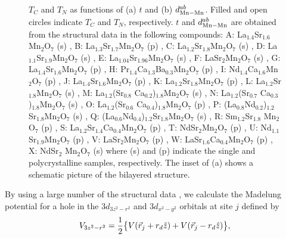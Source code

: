 \begin{figure}
\columnwidth
\centerline{}
\caption{ $T_C$ and $T_N$ as functions of (a) $t$  and (b) $d_{\rm Mn-Mn}^{ab}$.  Filled and open circles indicate $T_C$ and $T_N$, respectively.  $t$ and $d_{\rm Mn-Mn}^{ab}$ are obtained from the structural data in  the following compounds:  A: La$_{1.4}$Sr$_{1.6}$Mn$_2$O$_7$ (s) \protect\cite{kubota},  B: La$_{1.3}$Sr$_{1.7}$Mn$_2$O$_7$ (p) \protect\cite{kubota}, C: La$_{1.2}$Sr$_{1.8}$Mn$_2$O$_7$ (s) \protect\cite{kubota}, D: La$_{1.1}$Sr$_{1.9}$Mn$_2$O$_7$ (s) \protect\cite{kubota}, E: La$_{1.04}$Sr$_{1.96}$Mn$_2$O$_7$ (s) \protect\cite{kubota}, F: LaSr$_2$Mn$_2$O$_7$ (s) \protect\cite{kubota},  G: La$_{1.4}$Sr$_{1.6}$Mn$_2$O$_7$ (p) \protect\cite{argyriou99},  H: Pr$_{1.4}$Ca$_{1.3}$Ba$_{0.3}$Mn$_2$O$_7$ (p) \protect\cite{laffez},  I: Nd$_{1.4}$Ca$_{1.6}$Mn$_2$O$_7$ (p) \protect\cite{laffez},  J: La$_{1.4}$Sr$_{1.6}$Mn$_2$O$_7$ (p) \protect\cite{chi},  K: La$_{1.2}$Sr$_{1.8}$Mn$_2$O$_7$ (p) \protect\cite{argyriou97},  L: La$_{1.2}$Sr$_{1.8}$Mn$_2$O$_7$ (s) \protect\cite{akimoto},  M: La$_{1.2}$(Sr$_{0.8}$ Ca$_{0.2}$)$_{1.8}$Mn$_2$O$_7$ (s) \protect\cite{akimoto},  N: La$_{1.2}$(Sr$_{0.7}$ Ca$_{0.3}$)$_{1.8}$Mn$_2$O$_7$ (s) \protect\cite{akimoto},  O: La$_{1.2}$(Sr$_{0.6}$ Ca$_{0.4}$)$_{1.8}$Mn$_2$O$_7$ (p) \protect\cite{akimoto},  P: (La$_{0.8}$Nd$_{0.2}$)$_{1.2}$Sr$_{1.8}$Mn$_2$O$_7$ (s) \protect\cite{akimoto},  Q: (La$_{0.6}$Nd$_{0.4}$)$_{1.2}$Sr$_{1.8}$Mn$_2$O$_7$ (s) \protect\cite{akimoto},  R: Sm$_{1.2}$Sr$_{1.8}$ Mn$_2$O$_7$ (p) \protect\cite{battle98},  S: La$_{1.2}$Sr$_{1.4}$Ca$_{0.4}$Mn$_2$O$_7$ (p) \protect\cite{shen},  T: NdSr$_2$Mn$_2$O$_7$ (p) \protect\cite{battle96},  U: Nd$_{1.1}$Sr$_{1.9}$Mn$_2$O$_7$ (p) \protect\cite{battle96},  V: LaSr$_2$Mn$_2$O$_7$ (p) \protect\cite{seshadri},  W: LaSr$_{1.6}$Ca$_{0.4}$Mn$_2$O$_7$ (p) \protect\cite{akimoto2},  X: NdSr$_2$ Mn$_2$O$_7$ (s) \protect\cite{akimoto2}  where (s) and (p) indicate the single and polycrystalline samples,  respectively.  The inset of (a) shows a schematic picture of the bilayered structure.}
\label{fig:fig1}
\end{figure}
By using a large number of the structural
data \cite{kubota,argyriou99,laffez,chi,argyriou97,akimoto,battle98,shen,battle96,seshadri,akimoto2,notice},
we calculate the Madelung potential for a hole in the $3d_{3z^2-r^2}$ and $3d_{x^2-y^2}$ orbitals
at site $j$ defined by
\begin{equation}
V_{3z^2-r^2}={1 \over 2} \bigl \{V(\vec{r}_j+r_d \hat{z})+V(\vec{r}_j-r_d \hat{z}) \bigr \} ,
\end{equation}

